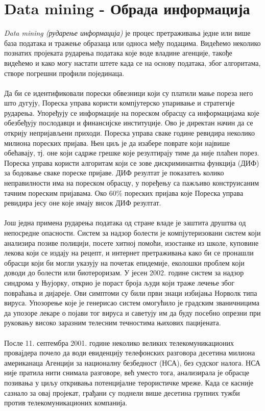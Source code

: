 \documentclass{article}
\begin{document}
\section{Data mining - Обрада информација}
\textit{Data mining (рударење информација)} је процес претраживања једне или више база података и тражење образаца или односа међу подацима. Видећемо неколико познатих пројеката рударења података које воде владине агенције, такође видећемо и како могу настати штете када се на основу података, због алгоритама, створе погрешни профили појединаца.
\\\\
Да би се идентификовали порески обвезници који су платили мање пореза него што дугују, Пореска управа користи компјутерско упаривање и стратегије рударења. Упоређују се информације на пореском обрасцу са информацијама које обезбеђују послодавци и финансијске институције. Ово је директан начин да се открију непријављени приходи. Пореска управа сваке године ревидира неколико милиона пореских пријава. Њен циљ је да изабере поврате који највише обећавају, тј. оне који садрже грешке које резултирају тиме да није плаћен порез. Пореска управа користи алгоритам који се зове дискриминантна функција (ДИФ) за бодовање сваке пореске пријаве. ДИФ резултат је показатељ колико неправилности има на пореском обрасцу, у поређењу са пажљиво конструисаним тачним пореским пријавама. Око 60\% пореских пријава које Пореска управа ревидира јесу оне које имају висок ДИФ резултат.
\\\\
Још једна примена рударења података од стране владе је заштита друштва од непосредне опасности. Систем за надзор болести је компјутеризовани систем који анализира позиве полицији, посете хитној помоћи, изостанке из школе, куповине лекова који се издају на рецепт, и интернет претраживања како би се пронашли обрасци који би могли указују на почетак епидемије, еколошки проблем који доводи до болести или биотероризам. У јесен 2002. године систем за надзор синдрома у Њујорку, открио је пораст броја људи који траже лечење због повраћања и дијареје. Ови симптоми су били први знаци избијања Норволк типа вируса. Упозорење које је генерисао систем омогућило је градским званичницима да упозоре лекаре о појави тог вируса и саветују им да буду посебно опрезни при руковању високо заразним телесним течностима њихових пацијената.
\\\\
После 11. септембра 2001. године неколико великих телекомуникационих провајдера почело да води евиденцију телефонских разговора десетина милиона американаца Агенцији за националну безбедност (НСА), без судског налога. НСА није пратила нити снимала разговоре, већ уместо тога, анализирала је обрасце позивања у циљу откривања потенцијалне терористичке мреже. Када се касније сазнало за овај пројекат, грађани су поднели више десетина групних тужби против телекомуникационих компанија.
\end{document}
